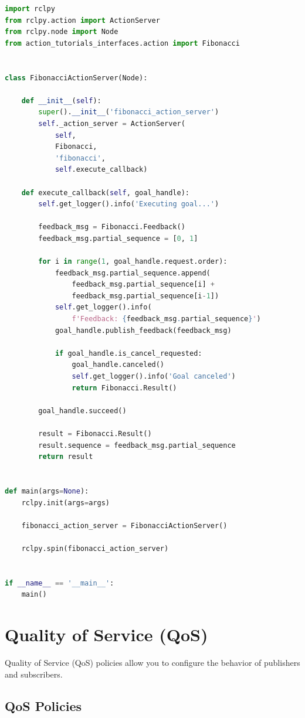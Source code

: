 \documentclass[a4paper,12pt]{book}
\begin{document}
\begin{lstlisting}[language=Python, caption=Fibonacci Action Server in Python]
import rclpy
from rclpy.action import ActionServer
from rclpy.node import Node
from action_tutorials_interfaces.action import Fibonacci


class FibonacciActionServer(Node):

    def __init__(self):
        super().__init__('fibonacci_action_server')
        self._action_server = ActionServer(
            self,
            Fibonacci,
            'fibonacci',
            self.execute_callback)

    def execute_callback(self, goal_handle):
        self.get_logger().info('Executing goal...')

        feedback_msg = Fibonacci.Feedback()
        feedback_msg.partial_sequence = [0, 1]

        for i in range(1, goal_handle.request.order):
            feedback_msg.partial_sequence.append(
                feedback_msg.partial_sequence[i] + 
                feedback_msg.partial_sequence[i-1])
            self.get_logger().info(
                f'Feedback: {feedback_msg.partial_sequence}')
            goal_handle.publish_feedback(feedback_msg)
            
            if goal_handle.is_cancel_requested:
                goal_handle.canceled()
                self.get_logger().info('Goal canceled')
                return Fibonacci.Result()

        goal_handle.succeed()

        result = Fibonacci.Result()
        result.sequence = feedback_msg.partial_sequence
        return result


def main(args=None):
    rclpy.init(args=args)

    fibonacci_action_server = FibonacciActionServer()

    rclpy.spin(fibonacci_action_server)


if __name__ == '__main__':
    main()
\end{lstlisting}

\chapter{Quality of Service (QoS)}

Quality of Service (QoS) policies allow you to configure the behavior of publishers and subscribers.

\section{QoS Policies}
\end{document}
